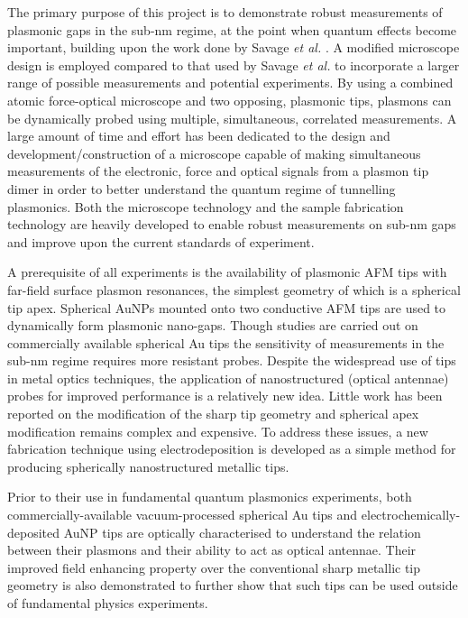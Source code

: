 \documentclass[12pt, a4paper, twoside]{book}
\begin{document}
The primary purpose of this project is to demonstrate robust measurements of plasmonic gaps in the sub-nm regime, at the point when quantum effects become important, building upon the work done by Savage \textit{et al.} \cite{savage2012}. A modified microscope design is employed compared to that used by Savage \textit{et al.} to incorporate a larger range of possible measurements and potential experiments. By using a combined atomic force-optical microscope and two opposing, plasmonic tips, plasmons can be dynamically probed using multiple, simultaneous, correlated measurements. A large amount of time and effort has been dedicated to the design and {\color{red}development/construction} of a microscope capable of making simultaneous measurements of the electronic, force and optical signals from a plasmon tip dimer in order to better understand the quantum regime of tunnelling plasmonics. Both the microscope technology and the sample fabrication technology are heavily developed to enable robust measurements on sub-nm gaps and improve upon the current standards of experiment.

A prerequisite of all experiments is the availability of plasmonic AFM tips with far-field surface plasmon resonances, the simplest geometry of which is a spherical tip apex. Spherical AuNPs mounted onto two conductive AFM tips are used to dynamically form plasmonic nano-gaps. Though studies are carried out on commercially available spherical Au tips the sensitivity of measurements in the sub-nm regime requires more resistant probes. Despite the widespread use of tips in metal optics techniques, the application of nanostructured (optical antennae) probes for improved performance is a relatively new idea. Little work has been reported on the modification of the sharp tip geometry and spherical apex modification remains complex and expensive. To address these issues, a new fabrication technique using electrodeposition is developed as a simple method for producing spherically nanostructured metallic tips.

Prior to their use in fundamental quantum plasmonics experiments, both commercially-available vacuum-processed spherical Au tips and electrochemically-deposited AuNP tips are optically characterised to understand the relation between their plasmons and their ability to act as optical antennae. Their improved field enhancing property over the conventional sharp metallic tip geometry is also demonstrated to further show that such tips can be used outside of fundamental physics experiments.
\end{document}
